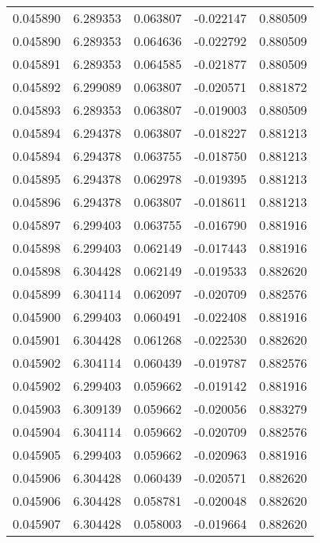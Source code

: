 \begin{tabular}{lrrrr}
0.045890    &  6.289353 &  0.063807 & -0.022147 &             0.880509 \\
0.045890    &  6.289353 &  0.064636 & -0.022792 &             0.880509 \\
0.045891    &  6.289353 &  0.064585 & -0.021877 &             0.880509 \\
0.045892    &  6.299089 &  0.063807 & -0.020571 &             0.881872 \\
0.045893    &  6.289353 &  0.063807 & -0.019003 &             0.880509 \\
0.045894    &  6.294378 &  0.063807 & -0.018227 &             0.881213 \\
0.045894    &  6.294378 &  0.063755 & -0.018750 &             0.881213 \\
0.045895    &  6.294378 &  0.062978 & -0.019395 &             0.881213 \\
0.045896    &  6.294378 &  0.063807 & -0.018611 &             0.881213 \\
0.045897    &  6.299403 &  0.063755 & -0.016790 &             0.881916 \\
0.045898    &  6.299403 &  0.062149 & -0.017443 &             0.881916 \\
0.045898    &  6.304428 &  0.062149 & -0.019533 &             0.882620 \\
0.045899    &  6.304114 &  0.062097 & -0.020709 &             0.882576 \\
0.045900    &  6.299403 &  0.060491 & -0.022408 &             0.881916 \\
0.045901    &  6.304428 &  0.061268 & -0.022530 &             0.882620 \\
0.045902    &  6.304114 &  0.060439 & -0.019787 &             0.882576 \\
0.045902    &  6.299403 &  0.059662 & -0.019142 &             0.881916 \\
0.045903    &  6.309139 &  0.059662 & -0.020056 &             0.883279 \\
0.045904    &  6.304114 &  0.059662 & -0.020709 &             0.882576 \\
0.045905    &  6.299403 &  0.059662 & -0.020963 &             0.881916 \\
0.045906    &  6.304428 &  0.060439 & -0.020571 &             0.882620 \\
0.045906    &  6.304428 &  0.058781 & -0.020048 &             0.882620 \\
0.045907    &  6.304428 &  0.058003 & -0.019664 &             0.882620 \\

\end{tabular}
